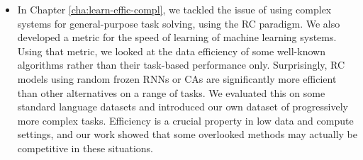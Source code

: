 \begin{itemize}
  \item In Chapter \ref{cha:learn-effic-compl}, we tackled the issue of using
        complex systems for general-purpose task solving, using the \ac{RC}
        paradigm. We also developed a metric for the speed of learning of
        machine learning systems. Using that metric, we looked at the data
        efficiency of some well-known algorithms rather than their task-based
        performance only. Surprisingly, \ac{RC} models using random frozen
        \acp{RNN} or \acp{CA} are significantly more efficient than other
        alternatives on a range of tasks. We evaluated this on some standard
        language datasets and introduced our own dataset of progressively more
        complex tasks. Efficiency is a crucial property in low data and compute
        settings, and our work showed that some overlooked methods may actually
        be competitive in these situations.
\end{itemize}
